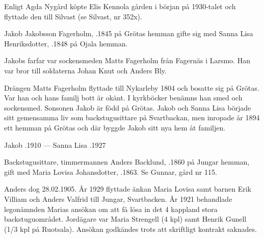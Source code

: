 Enligt Agda Nygård köpte Elis Kennola gården i början på 1930-talet och flyttade den till Silvast (se Silvast, nr 352x).


%
Jakob Jakobsson Fagerholm, .1845 på Grötas hemman gifte sig med Sanna Lisa Henriksdotter, .1848 på	Ojala hemman.
\begin{jhchildren}
  \item {}
  \item {}
  \item {}
  \item {}
\end{jhchildren}
Jakobs farfar var sockensmeden Matts Fagerholm från Fagernäs i Larsmo. Han var bror till soldaterna Johan Knut och Anders Bly.

Drängen Matts Fagerholm flyttade till Nykarleby 1804 och bosatte sig på Grötas. Var han och hans familj bott är okänt. I kyrkböcker benämns han smed och sockensmed. Sonsonen Jakob är född på Grötas. Jakob och Sanna Lisa började sitt gemensamma liv som backstugusittare på Svartbackan, men inropade år 1894 ett hemman på Grötas och där byggde Jakob sitt nya hem åt familjen.

Jakob .1910  ---  Sanna Lisa .1927




%


%
Backstugusittare, timmermannen Anders Backlund, .1860 på Jungar hemman, gift med Maria Lovisa Johansdotter, .1863. Se Gunnar, gård nr 115.

Anders dog 28.02.1905. År 1929 flyttade änkan Maria Lovisa samt barnen Erik Villiam och Anders Valfrid till Jungar, Svartbacken. År 1921 behandlade legonämnden Marias ansökan om att få lösa in det 4 kappland stora backstuguområdet. Jordägare var Maria Strengell (4 kpl) samt Henrik Gunell (1/3 kpl på Ruotsala). Ansökan godkändes trots att skriftligt kontrakt saknades.

